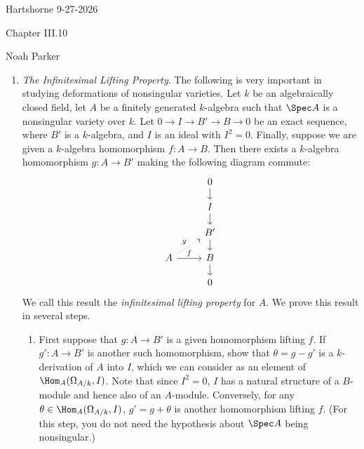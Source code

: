 \documentclass[12pt]{amsart}
\begin{document}
{Hartshorne} \hfill {9-27-2026}

\bigskip\bigskip

\begin{center}

{\sc Chapter III.10}

\end{center}

\begin{center}

  {Noah Parker} 
    
\end{center}

\bigskip\bigskip

\begin{enumerate}
  \item[II.8.6.] {
      \emph{The Infinitesimal Lifting Property}.
      The following is very important in studying deformations of nonsingular varieties.
      Let $k$ be an algebraically closed field, let $A$ be a finitely generated $k$-algebra such that $\Spec A$ is a nonsingular variety over $k$.
      Let $0\to I\to B'\to B\to 0$ be an exact sequence, where $B'$ is a $k$-algebra, and $I$ is an ideal with $I^2=0$.
      Finally, suppose we are given a $k$-algebra homomorphism $f:A\to B$.
      Then there exists a $k$-algebra homomorphism $g:A\to B'$ making the following diagram commute:
      \[
        \begin{tikzcd}[row sep = 0.4cm]
          & 0\ar[d] \\
          & I\ar[d] \\
          & B'\ar[d] \\
          A\ar[r,"f"]\ar[ur,dotted, "g"]& B\ar[d] \\
          & 0
        \end{tikzcd}
      \] 
      We call this result the \emph{infinitesimal lifting property} for $A$.
      We prove this result in several steps.
      \begin{enumerate}
        \item First suppose that $g:A\to B'$ is a given homomorphism lifting $f$.
          If $g':A\to B'$ is another such homomorphism, show that $\theta=g-g'$ is a $k$-derivation of $A$ into $I$, which we can consider as an element of $\Hom_A(\Omega_{A/k},I)$.
          Note that since $I^2=0$, $I$ has a natural structure of a $B$-module and hence also of an $A$-module.
          Conversely, for any $\theta\in \Hom_A(\Omega_{A/k},I)$, $g'=g+\theta$ is another homomorphism lifting $f$.
          (For this step, you do not need the hypothesis about $\Spec A$ being nonsingular.)

\end{enumerate}}
\end{enumerate}
\end{document}
